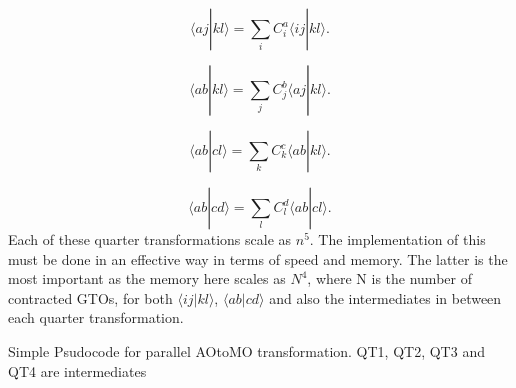 \documentclass[a4paper,norsk,11pt,twoside]{report}
\begin{document}
\begin{equation}
\langle aj|kl \rangle = \sum_{i} C_i^a \langle ij|kl \rangle .
\end{equation}

\begin{equation}
\langle ab|kl \rangle = \sum_{j} C_j^b \langle aj|kl \rangle .
\end{equation}

\begin{equation}
\langle ab|cl \rangle = \sum_{k} C_k^c \langle ab|kl \rangle .
\end{equation}

\begin{equation}
\langle ab|cd \rangle = \sum_{l} C_l^d \langle ab|cl \rangle .
\end{equation}
Each of these quarter transformations scale as $n^5$. The implementation of this must be done in an effective way in terms of speed and memory. The latter is the most important as the memory here scales as $N^4$, where N is the number of contracted GTOs, for both $\langle ij | kl\rangle$, $\langle ab | cd \rangle$ and also the intermediates in between each quarter transformation. \\

\begin{algorithm}[H]
  
 \caption{Simple Psudocode for parallel AOtoMO transformation. QT1, QT2, QT3 and QT4 are intermediates}
 \label{aotomotrans}
\end{algorithm}
\end{document}
